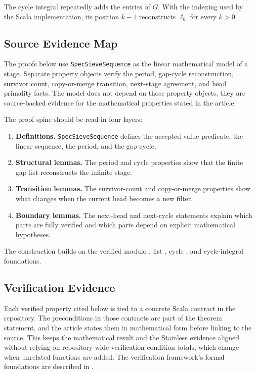 The cycle integral repeatedly adds the entries of $G$. With the indexing
used by the Scala implementation, its position $k-1$ reconstructs
$\ell_k$ for every $k\gt0$.

\subsection{Source Evidence Map}
\label{sec:source-evidence-map}

The proofs below use \texttt{SpecSieveSequence} as the linear
mathematical model of a stage. Separate property objects verify the
period, gap-cycle reconstruction, survivor count, copy-or-merge
transition, next-stage agreement, and head primality facts. The model
does not depend on those property objects; they are source-backed
evidence for the mathematical properties stated in the article.

The proof spine should be read in four layers:

\begin{enumerate}
  \item \textbf{Definitions.} \texttt{SpecSieveSequence} defines the
    accepted-value predicate, the linear sequence, the period, and the gap
    cycle.
  \item \textbf{Structural lemmas.} The period and cycle properties show
    that the finite gap list reconstructs the infinite stage.
  \item \textbf{Transition lemmas.} The survivor-count and copy-or-merge
    properties show what changes when the current head becomes a new
    filter.
  \item \textbf{Boundary lemmas.} The next-head and next-cycle statements
    explain which parts are fully verified and which parts depend on
    explicit mathematical hypotheses.
\end{enumerate}

The construction builds on the verified modulo \cite{mata2026modulo},
list \cite{mata2026lists}, cycle \cite{mata2026cycle}, and cycle-integral
\cite{mata2026integralcycle} foundations.

\subsection{Verification Evidence}
\label{sec:verification-evidence}

Each verified property cited below is tied to a concrete Scala contract
in the repository. The preconditions in those contracts are part of the
theorem statement, and the article states them in mathematical form
before linking to the source. This keeps the mathematical result and the
Stainless evidence aligned without relying on repository-wide
verification-condition totals, which change when unrelated functions are
added. The verification framework's formal foundations are described in
\cite{hamza2019systemfr}.
